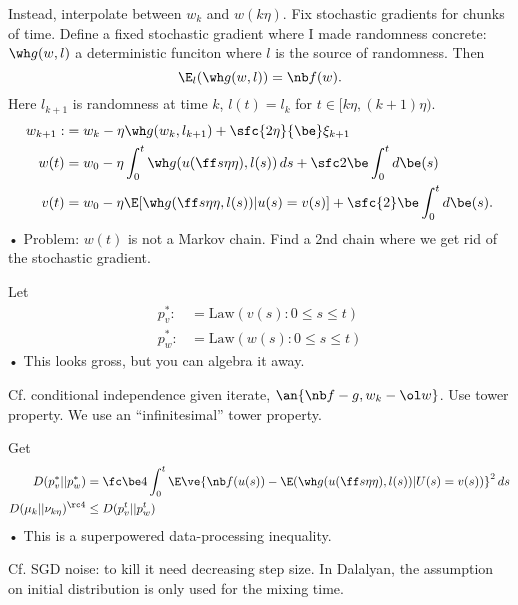 Instead, interpolate between $w_k$ and $w(k\eta)$. 
Fix stochastic gradients for chunks of time.
Define a fixed stochastic gradient where I made randomness concrete: $\wh g(w,l)$ a deterministic funciton where $l$ is the source of randomness.
Then
$$
\E_l (\wh g(w,l)) = \nb f(w).
$$
Here
$l_{k+1}$ is randomness at time $k$, $l(t) = l_{k}$ for $t\in [k\eta, (k+1)\eta)$.
\begin{align}
w_{k+1} :&= w_k - \eta\wh g(w_k, l_{k+1}) + \sfc{2\eta}{\be}\xi_{k+1}\\
w(t) &= w_0-\eta\int_0^t \wh g(u(\ff s\eta \eta),l(s))\,ds + \sfc 2\be\int_0^t d\be(s)\\
v(t) &= w_0-\eta \E[\wh g(\ff s\eta \eta, l(s))|u(s)=v(s)]
+ \sfc{2}\be \int_0^t d\be(s).
\end{align}•
Problem: $w(t)$ is not a Markov chain. Find a 2nd chain where we get rid of the stochastic gradient.


Let 
\begin{align}
p_v^* :&=\text{Law}(v(s): 0\le s\le t)\\
p_w^*:&=\text{Law}(w(s):0\le s\le t)
\end{align}•
This looks gross, but you can algebra it away.

Cf. conditional independence given iterate, $\an{\nb f - g, w_k-\ol w}$. Use tower property. We use an ``infinitesimal'' tower property.

Get
\begin{align}
D(p_v^*||p_w^*) &= \fc \be 4\int_0^t 
\E\ve{\nb f (u(s)) - \E(\wh g(u(\ff s\eta \eta), l(s))|U(s)=v(s))}^2\,ds\\
D(\mu_k||\nu_{k\eta})^{\rc 4}&\le D(p_v^t||p_w^t)%
\end{align}•
This is a superpowered data-processing inequality.


Cf. SGD noise: to kill it need decreasing step size. In Dalalyan, the assumption on initial distribution is only used for the mixing time.

